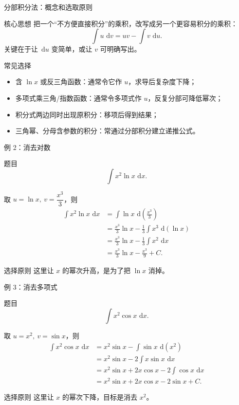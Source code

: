 \documentclass[aspectratio=169,10pt]{ctexbeamer}
\newcommand{\dd}{\,\mathrm{d}}
\begin{document}
\begin{frame}[t]{分部积分法：概念和选取原则}
\small
\begin{block}{核心思想}
把一个“不方便直接积分”的乘积，改写成另一个更容易积分的乘积：
\[
  \int u\,\dd v=uv-\int v\,\dd u.
\]
关键在于让 $\dd u$ 变简单，或让 $v$ 可明确写出。
\end{block}

\begin{block}{常见选择}
\begin{itemize}
  \item 含 $\ln x$ 或反三角函数：通常令它作 $u$，求导后复杂度下降；
  \item 多项式乘三角/指数函数：通常令多项式作 $u$，反复分部可降低幂次；
  \item 积分式两边同时出现原积分：移项后得到结果；
  \item 三角幂、分母含参数的积分：常通过分部积分建立递推公式。
\end{itemize}
\end{block}
\end{frame}

\begin{frame}[t,shrink=5]{例 2：消去对数}
\small
\begin{block}{题目}
\[
  \int x^2\ln x\,\dd x.
\]
\end{block}

取 $u=\ln x,\ v=\dfrac{x^3}{3}$，则
\[
\begin{aligned}
\int x^2\ln x\,\dd x
&=\int \ln x\,\dd\left(\frac{x^3}{3}\right)\\
&=\frac{x^3}{3}\ln x-\frac13\int x^3\,\dd(\ln x)\\
&=\frac{x^3}{3}\ln x-\frac13\int x^2\,\dd x\\
&=\frac{x^3}{3}\ln x-\frac{x^3}{9}+C.
\end{aligned}
\]
\begin{alertblock}{选择原则}
这里让 $x$ 的幂次升高，是为了把 $\ln x$ 消掉。
\end{alertblock}
\end{frame}

\begin{frame}[t]{例 3：消去多项式}
\small
\begin{block}{题目}
\[
  \int x^2\cos x\,\dd x.
\]
\end{block}

取 $u=x^2,\ v=\sin x$，则
\[
\begin{aligned}
\int x^2\cos x\,\dd x
&=x^2\sin x-\int \sin x\,\dd(x^2)\\
&=x^2\sin x-2\int x\sin x\,\dd x\\
&=x^2\sin x+2x\cos x-2\int\cos x\,\dd x\\
&=x^2\sin x+2x\cos x-2\sin x+C.
\end{aligned}
\]
\begin{alertblock}{选择原则}
这里让 $x$ 的幂次下降，目标是消去 $x^2$。
\end{alertblock}
\end{frame}
\end{document}
